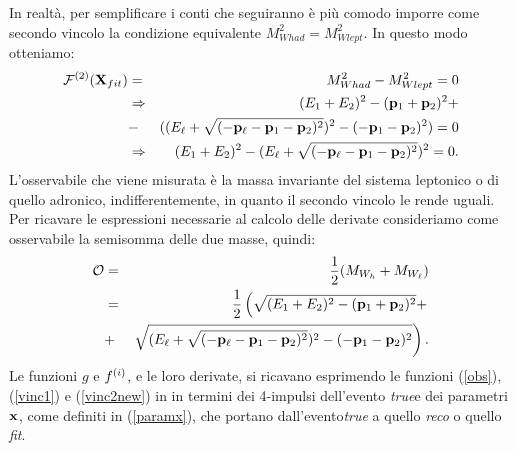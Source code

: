 In realt\`a, per semplificare i conti che seguiranno \`e pi\`u comodo imporre come secondo vincolo la condizione equivalente $M^2_{Whad}=M^2_{Wlept}$. In questo
modo otteniamo:
\begin{eqnarray}
\label{vinc2new}
{\cal F}^{(2)}({\bf X}_{fit})&=&M^2_{Whad}-M^2_{Wlept}=0\nonumber\\
&\Rightarrow&(E_1+E_2)^2-({\bf p}_1+{\bf p}_2)^2+\nonumber\\
&-&((E_\ell+\sqrt{(-{\bf p}_\ell-{\bf p}_1-{\bf p}_2)^2})^2-(-{\bf p}_1-{\bf p}_2)^2)=0\nonumber\\
&\Rightarrow&(E_1+E_2)^2-(E_\ell+\sqrt{(-{\bf p}_\ell-{\bf p}_1-{\bf p}_2)^2})^2=0.
\end{eqnarray}
L'osservabile che viene misurata \`e la massa invariante del sistema leptonico
o di quello adronico, indifferentemente, in quanto il secondo vincolo le rende
uguali. Per ricavare le espressioni necessarie al calcolo delle derivate consideriamo
come osservabile la semisomma delle due masse, quindi:
\begin{eqnarray}
\label{obs}
{\cal O}&=&\frac{1}{2}(M_{W_h}+M_{W_\ell})\nonumber\\
&=&\frac{1}{2}\left(\sqrt{(E_1+E_2)^2-({\bf p}_1+{\bf p}_2)^2}+\right.\nonumber\\
&+&\left.\sqrt{(E_\ell+\sqrt{(-{\bf p}_\ell-{\bf p}_1-{\bf p}_2)^2})^2-(-{\bf p}_1-{\bf p}_2)^2}\right).
\end{eqnarray}
Le funzioni $g$ e $f^{(i)}$, e le loro derivate, si ricavano esprimendo le funzioni (\ref{obs}), (\ref{vinc1}) e (\ref{vinc2new}) in in termini dei 4-impulsi dell'evento {\em true}e dei parametri ${\bf x}$, come definiti in (\ref{paramx}), che portano dall'evento{\em true} a quello {\em reco} o quello {\em fit}.
%
